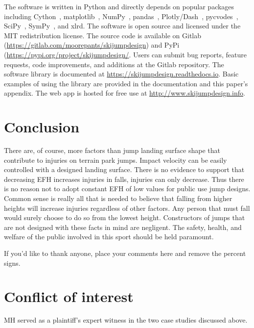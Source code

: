 \documentclass[smallextended]{svjour3}       %
\begin{document}
The software is written in Python and directly depends on popular packages
including Cython~\cite{Behnel2011}, matplotlib~\cite{Hunter2007},
NumPy~\cite{Oliphant2006}, pandas~\cite{McKinney2020},
Plotly/Dash~\cite{Plotly2015}, pycvodes~\cite{Dahlgren2018},
SciPy~\cite{Virtanen2020}, SymPy~\cite{Meurer2017}, and xlrd. The software is
open source and licensed under the MIT redistribution license. The source code
is available on Gitlab (\url{https://gitlab.com/moorepants/skijumpdesign}) and
PyPi (\url{https://pypi.org/project/skijumpdesign/}. Users can submit bug
reports, feature requests, code improvements, and additions at the Gitlab
repository. The software library is documented at
\url{https://skijumpdesign.readthedocs.io}. Basic examples of using the library
are provided in the documentation and this paper's appendix. The web app is
hosted for free use at \url{http://www.skijumpdesign.info}.

\section{Conclusion}
\label{sec:conc}
%
There are, of course, more factors than jump landing surface shape that
contribute to injuries on terrain park jumps. Impact velocity can be easily
controlled with a designed landing surface. There is no evidence to support
that decreasing EFH increases injuries in falls,  injuries can only decrease. Thus there is no reason not to adopt
constant EFH of low values for public use jump designs.
Common sense is really all that is needed to believe that falling from higher
heights will increase injuries regardless of other factors. Any
person that must fall would surely choose to do so from the lowest height.
Constructors of jumps that are not designed with these facts in
mind are negligent. The safety, health, and welfare of the public involved in
this sport should be held paramount.

\begin{acknowledgements}
If you'd like to thank anyone, place your comments here
and remove the percent signs.
\end{acknowledgements}

%
\section*{Conflict of interest}
\label{sec:conflict}
%
MH served as a plaintiff's expert witness in the two case studies discussed above.
\end{document}
